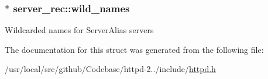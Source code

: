 \subsubsection[{\texorpdfstring{wild\+\_\+names}{wild_names}}]{$\ast$ server\+\_\+rec\+::wild\+\_\+names}\hypertarget{structserver__rec_abc770038c73cf49b3cdbd975de2ffbac}{}\label{structserver__rec_abc770038c73cf49b3cdbd975de2ffbac}
Wildcarded names for Server\+Alias servers 

The documentation for this struct was generated from the following file\+:\begin{DoxyCompactItemize}
\item 
/usr/local/src/github/\+Codebase/httpd-\/2../include/\hyperlink{httpd_8h}{httpd.\+h}\end{DoxyCompactItemize}
